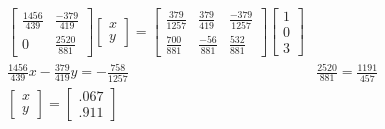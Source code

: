 \documentclass[10pt,letterpaper]{article}
\begin{document}
	\begin{align*}
	& \begin{bmatrix}
	\frac{1456}{439} & \frac{-379}{419} \\ 0 & \frac{2520}{881}
	\end{bmatrix} \begin{bmatrix}
	x \\ y
	\end{bmatrix} = \begin{bmatrix}
	\frac{379}{1257} & \frac{379}{419} & \frac{-379}{1257} \\ 
	\frac{700}{881} & \frac{-56}{881} & \frac{532}{881}
	\end{bmatrix} \begin{bmatrix}
	1 \\ 0 \\ 3
	\end{bmatrix} \\ 
	& \frac{1456}{439}x - \frac{379}{419}y = -\frac{758}{1257} & \frac{2520}{881} = \frac{1191}{457} \\
	& \boxed{\begin{bmatrix}
		x\\y
		\end{bmatrix} = \begin{bmatrix}
		.067 \\ .911
		\end{bmatrix}}
	\end{align*}
	
\end{document}
